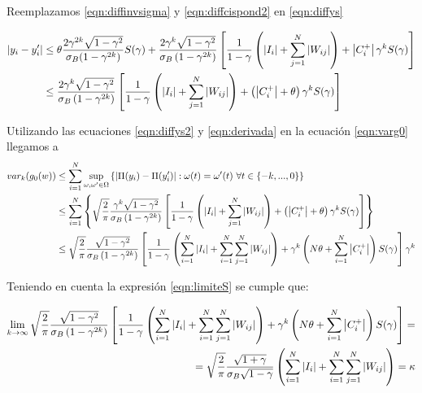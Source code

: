 Reemplazamos \eqref{eqn:diffinvsigma} y \eqref{eqn:diffcispond2} en \eqref{eqn:diffys}

\begin{align}
\nonumber  \left|y_i - y_i'\right|  & \leq 
    \theta \frac{2 \gamma^{2k} \sqrt{1-\gamma^{2}}}{\sigma_B (1-\gamma^{2k})} S(\gamma) + 
    \frac{2 \gamma^k \sqrt{1-\gamma^2}}{\sigma_B \left(1-\gamma^{2k}\right)} 
    \left[ \frac{1 }{1-\gamma} \left( \left|I_i\right| + \sum_{j=1}^N \left|W_{ij}\right| \right) + \left|C_i^+\right|  \gamma^k S(\gamma) \right] \\
    & \leq \frac{2 \gamma^k \sqrt{1-\gamma^2}}{\sigma_B \left(1-\gamma^{2k}\right)} 
    \left[ \frac{1 }{1-\gamma} \left( \left|I_i\right| + \sum_{j=1}^N \left|W_{ij}\right| \right) + \left(\left|C_i^+\right| +\theta \right) \gamma^k S(\gamma) \right]    
    \label{eqn:diffys2}
\end{align}

 Utilizando las ecuaciones \eqref{eqn:diffys2} y \eqref{eqn:derivada} en la ecuación \eqref{eqn:varg0} llegamos a
  \begin{align}
     \nonumber var_k(g_0(w)) & \leq \sum_{i=1}^N \sup_{\omega,\omega' \in \Omega} \left\{ \left|\Pi(y_i)-\Pi(y_i')\right| : \omega(t)=\omega'(t) \ \forall t \in \{-k, ... ,0\}\right\} \\
\nonumber & \leq \sum_{i=1}^N \left\{
    \sqrt{\frac{2}{\pi}}\frac{ \gamma^k \sqrt{1-\gamma^2}}{\sigma_B \left(1-\gamma^{2k}\right)} 
    \left[ \frac{1 }{1-\gamma} \left( \left|I_i\right| + \sum_{j=1}^N \left|W_{ij}\right| \right) + \left(\left|C_i^+\right| +\theta \right) \gamma^k S(\gamma) \right] \right\} \\
\nonumber & \leq  
    \sqrt{\frac{2}{\pi}} \frac{  \sqrt{1-\gamma^2}}{\sigma_B \left(1-\gamma^{2k}\right)} 
    \left[ \frac{1 }{1-\gamma} \left( \sum_{i=1}^N \left|I_i\right| + \sum_{i=1}^N \sum_{j=1}^N \left|W_{ij}\right| \right) + \gamma^k \left( N \theta + \sum_{i=1}^N \left|C_i^+\right|  \right)  S(\gamma) \right]    \gamma^k
    \label{eqn:variacion}
 \end{align}

Teniendo en cuenta la expresión \eqref{eqn:limiteS} se cumple que:

\begin{align*}
    \lim_{k\rightarrow\infty} {\sqrt{\frac{2}{\pi}} \frac{  \sqrt{1-\gamma^2}}{\sigma_B \left(1-\gamma^{2k}\right)} 
    \left[ \frac{1 }{1-\gamma} \left( \sum_{i=1}^N \left|I_i\right| + \sum_{i=1}^N \sum_{j=1}^N \left|W_{ij}\right| \right) + \gamma^k \left( N \theta + \sum_{i=1}^N \left|C_i^+\right|  \right)  S(\gamma) \right]  } = \\
     = \sqrt{\frac{2}{\pi}} \frac{  \sqrt{1+\gamma}}{\sigma_B \sqrt{1-\gamma} }
    \left( \sum_{i=1}^N \left|I_i\right| + \sum_{i=1}^N \sum_{j=1}^N \left|W_{ij}\right| \right) = \kappa
\end{align*}

